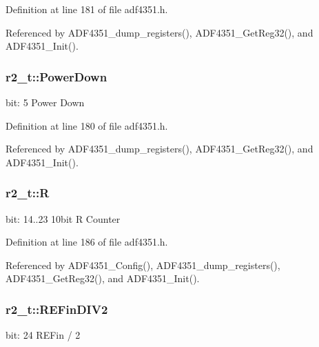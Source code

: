 Definition at line 181 of file adf4351.\+h.



Referenced by A\+D\+F4351\+\_\+dump\+\_\+registers(), A\+D\+F4351\+\_\+\+Get\+Reg32(), and A\+D\+F4351\+\_\+\+Init().

\subsubsection[{\texorpdfstring{Power\+Down}{PowerDown}}]{ r2\+\_\+t\+::\+Power\+Down}\hypertarget{structr2__t_a3aadc869234fb281b178032be276ca00}{}\label{structr2__t_a3aadc869234fb281b178032be276ca00}
bit\+: 5 Power Down 

Definition at line 180 of file adf4351.\+h.



Referenced by A\+D\+F4351\+\_\+dump\+\_\+registers(), A\+D\+F4351\+\_\+\+Get\+Reg32(), and A\+D\+F4351\+\_\+\+Init().

\subsubsection[{\texorpdfstring{R}{R}}]{ r2\+\_\+t\+::R}\hypertarget{structr2__t_a0abc2956b7cbc989552c17264973d24d}{}\label{structr2__t_a0abc2956b7cbc989552c17264973d24d}
bit\+: 14..23 10bit R Counter 

Definition at line 186 of file adf4351.\+h.



Referenced by A\+D\+F4351\+\_\+\+Config(), A\+D\+F4351\+\_\+dump\+\_\+registers(), A\+D\+F4351\+\_\+\+Get\+Reg32(), and A\+D\+F4351\+\_\+\+Init().

\subsubsection[{\texorpdfstring{R\+E\+Fin\+D\+I\+V2}{REFinDIV2}}]{ r2\+\_\+t\+::\+R\+E\+Fin\+D\+I\+V2}\hypertarget{structr2__t_aa036b7abbb6147e0c155101addc1490c}{}\label{structr2__t_aa036b7abbb6147e0c155101addc1490c}
bit\+: 24 R\+E\+Fin / 2 

